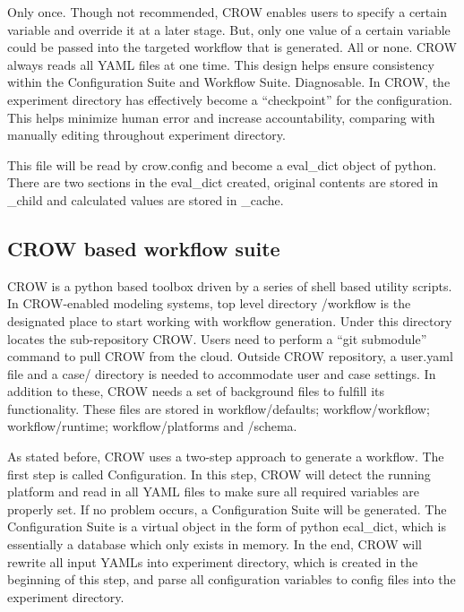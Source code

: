 Only once. Though not recommended, C\-R\-O\-W enables users to specify a certain variable and override it at a later stage. But, only one value of a certain variable could be passed into the targeted workflow that is generated. All or none. C\-R\-O\-W always reads all Y\-A\-M\-L files at one time. This design helps ensure consistency within the Configuration Suite and Workflow Suite. Diagnosable. In C\-R\-O\-W, the experiment directory has effectively become a “checkpoint” for the configuration. This helps minimize human error and increase accountability, comparing with manually editing throughout experiment directory.

This file will be read by crow.\-config and become a eval\-\_\-dict object of python. There are two sections in the eval\-\_\-dict created, original contents are stored in \-\_\-child and calculated values are stored in \-\_\-cache.

\subsection*{C\-R\-O\-W based workflow suite }

C\-R\-O\-W is a python based toolbox driven by a series of shell based utility scripts. In C\-R\-O\-W-\/enabled modeling systems, top level directory /workflow is the designated place to start working with workflow generation. Under this directory locates the sub-\/repository C\-R\-O\-W. Users need to perform a “git submodule” command to pull C\-R\-O\-W from the cloud. Outside C\-R\-O\-W repository, a user.\-yaml file and a case/ directory is needed to accommodate user and case settings. In addition to these, C\-R\-O\-W needs a set of background files to fulfill its functionality. These files are stored in workflow/defaults; workflow/workflow; workflow/runtime; workflow/platforms and /schema.

As stated before, C\-R\-O\-W uses a two-\/step approach to generate a workflow. The first step is called Configuration. In this step, C\-R\-O\-W will detect the running platform and read in all Y\-A\-M\-L files to make sure all required variables are properly set. If no problem occurs, a Configuration Suite will be generated. The Configuration Suite is a virtual object in the form of python ecal\-\_\-dict, which is essentially a database which only exists in memory. In the end, C\-R\-O\-W will rewrite all input Y\-A\-M\-Ls into experiment directory, which is created in the beginning of this step, and parse all configuration variables to config files into the experiment directory.

